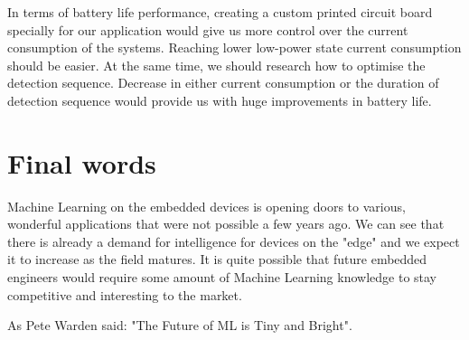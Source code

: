 In terms of battery life performance, creating a custom printed circuit board specially for our application would give us more control over the current consumption of the systems. Reaching lower low-power state current consumption should be easier.
At the same time, we should research how to optimise the detection sequence. 
Decrease in either current consumption or the duration of detection sequence would provide us with huge improvements in battery life.


\section{ Final words}

Machine Learning on the embedded devices is opening doors to various, wonderful applications that were not possible a few years ago.
We can see that there is already a demand for intelligence for devices on the "edge" and we expect it to increase as the field matures.
It is quite possible that future embedded engineers would require some amount of Machine Learning knowledge to stay competitive and interesting to the market.

As Pete Warden said: "The Future of ML is Tiny and Bright".
